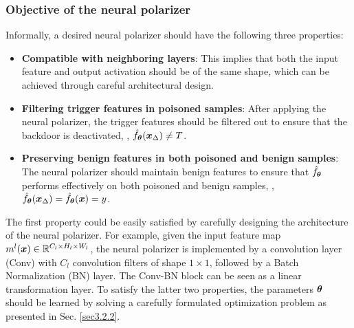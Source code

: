 \subsubsection{Objective of the neural polarizer\label{sec3.2.1}}
Informally, a desired neural polarizer should have the following three properties:
\begin{itemize}[leftmargin=*]
    \item \textbf{Compatible with neighboring layers}: This implies that both the input feature and output activation should be of the same shape, which can be achieved through careful architectural design.
    \item \textbf{Filtering trigger features in poisoned samples}: After applying the neural polarizer, the trigger features should be filtered out to ensure that the backdoor is deactivated, \ie, $\hat{f}_{\bm{\theta}}(\bm{x}_{\Delta})\neq T$.
    \item \textbf{Preserving benign features in both poisoned and benign samples}: The neural polarizer should maintain benign features to ensure that $\hat{f}_{\bm{\theta}}$ performs effectively on both poisoned and benign samples, \ie, $\hat{f}_{\bm{\theta}}(\bm{x}_{\Delta})= \hat{f}_{\bm{\theta}}(\bm{x}) = y$.     
\end{itemize}
The first property could be easily satisfied by carefully designing the architecture of the neural polarizer. For example, given the input feature map \(m^l(\bm{x}) \in \mathbb{R}^{C_l \times H_l \times W_l}\), the neural polarizer is implemented by a convolution layer (Conv) with $C_l$ convolution filters of shape $1\times1$, followed by a Batch Normalization (BN) layer. The Conv-BN block can be seen as a linear transformation layer. 
To satisfy the latter two properties, the parameters $\bm{\theta}$ should be learned by solving a carefully formulated optimization problem as presented in Sec. \ref{sec3.2.2}.

